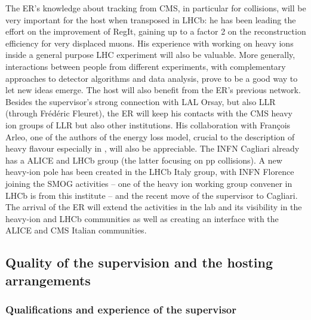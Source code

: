 \documentclass[a4paper,11pt]{article}
\newcommand{\ER}{ER\xspace}
\newcommand{\supervisor}{the supervisor\xspace}
\begin{document}
The \ER's knowledge about tracking from CMS, in particular for \pbpb collisions, will be very important for the host when transposed in LHCb: he has been leading the effort on the improvement of RegIt, gaining up to a factor 2 on the reconstruction efficiency for very displaced muons. His experience with working on heavy ions inside a general purpose LHC experiment will also be valuable. More generally, interactions between people from different experiments, with complementary approaches to detector algorithms and data analysis, prove to be a good way to let new ideas emerge. 
%
The host will also benefit from the \ER's previous network. Besides \supervisor's strong connection with LAL Orsay, but also LLR (through Frédéric Fleuret), the \ER will keep his contacts with the CMS heavy ion groups of LLR but also other institutions. His collaboration with François Arleo, one of the authors of the energy loss model, crucial to the description of heavy flavour especially in \ppb, will also be appreciable.
%
The INFN Cagliari already has a ALICE and LHCb group (the latter
focusing on pp collisions). A new heavy-ion pole has been created in the
LHCb Italy group, with INFN Florence joining the SMOG activities -- one 
of the heavy ion working group convener in LHCb is from this institute --
and the recent move of \supervisor to Cagliari. The arrival of the 
\ER will extend the activities in the lab and its visibility in
the heavy-ion and LHCb communities as well as creating an
interface with the ALICE and CMS Italian communities.



%           

\subsection{Quality of the supervision and the hosting arrangements} 
\label{sec:supervision}

\subsubsection{Qualifications and experience of the supervisor}

% 
\end{document}
